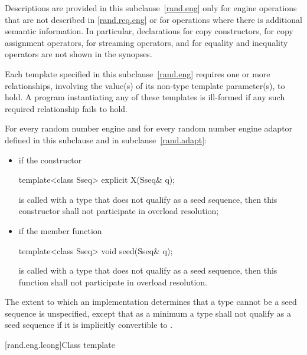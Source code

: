 \pnum
Descriptions are provided in this subclause~\ref{rand.eng}
only for engine operations
that are not described in \ref{rand.req.eng}
or for operations where there is additional semantic information.
In particular,
declarations for copy constructors,
for copy assignment operators,
for streaming operators,
and for equality and inequality operators
are not shown in the synopses.

\pnum
Each template specified in this subclause~\ref{rand.eng}
requires one or more relationships,
involving the value(s) of its non-type template parameter(s), to hold.
A program instantiating any of these templates
is ill-formed
if any such required relationship fails to hold.

\pnum
For every random number engine and for every random number engine adaptor 
defined in this subclause and in subclause~\ref{rand.adapt}:

\begin{itemize}
\item
if the constructor
\begin{codeblock}
template<class Sseq> explicit X(Sseq& q);
\end{codeblock}
is called with a type  that does not qualify as a seed sequence, then this
constructor shall not participate in overload resolution;

\item
if the member function
\begin{codeblock}
template<class Sseq> void seed(Sseq& q);
\end{codeblock}
is called with a type  that does not qualify as a seed sequence, then this
function shall not participate in overload resolution.
\end{itemize}

The extent to which an implementation determines that a type cannot be a seed sequence
is unspecified, except that as a minimum a type shall not qualify as a seed sequence
if it is implicitly convertible to .


[rand.eng.lcong]{Class template }%
%

